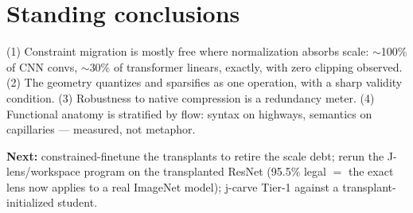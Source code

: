 \documentclass[10pt]{article}
\begin{document}
\section{Standing conclusions}
(1) Constraint migration is mostly free where normalization absorbs
scale: $\sim$100\% of CNN convs, $\sim$30\% of transformer linears,
exactly, with zero clipping observed. (2) The geometry quantizes and
sparsifies as one operation, with a sharp validity condition. (3)
Robustness to native compression is a redundancy meter. (4) Functional
anatomy is stratified by flow: syntax on highways, semantics on
capillaries --- measured, not metaphor.

\textbf{Next:} constrained-finetune the transplants to retire the scale
debt; rerun the J-lens/workspace program on the transplanted ResNet
(95.5\% legal $=$ the exact lens now applies to a real ImageNet model);
j-carve Tier-1 against a transplant-initialized student.
\end{document}
